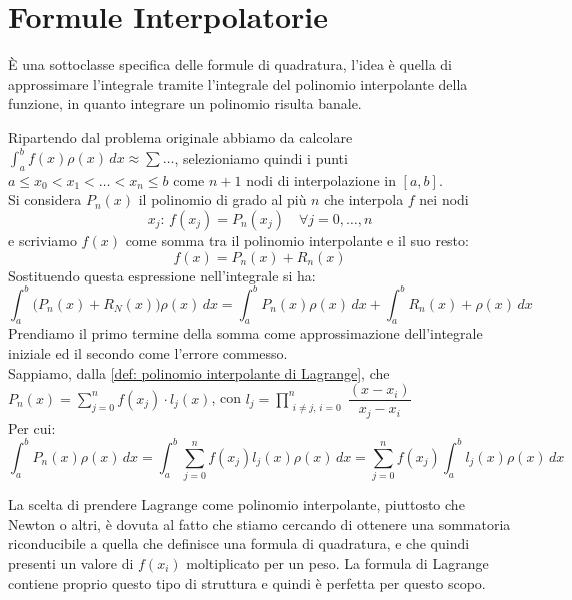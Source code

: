 \documentclass[12pt,a4paper,]{report}
\begin{document}
\section{Formule Interpolatorie}
\begin{nota}
    È una sottoclasse specifica delle formule di quadratura, l'idea è quella di approssimare l'integrale tramite l'integrale del polinomio interpolante della funzione, in quanto integrare un polinomio risulta banale. 
\end{nota}
\noindent
Ripartendo dal problema originale abbiamo da calcolare $\displaystyle\int_{a}^{b} f(x)\rho(x)\,dx \approx \sum \dots$, selezioniamo quindi i punti $a \leq x_0 < x_1 < \ldots < x_n \leq b$ come $n+1$ nodi di interpolazione in $[a, b]$.\\
Si considera $P_n(x)$ il polinomio di grado al più $n$ che interpola $f$ nei nodi 
\[
x_j:\, f(x_j) = P_n(x_j)\quad \forall j = 0,\ldots,n
\]
e scriviamo $f(x)$ come somma tra il polinomio interpolante e il suo resto:
$$f(x) = P_n(x) + R_n(x)$$
Sostituendo questa espressione nell'integrale si ha:
\[
\int_{a}^{b} \bigl(P_n(x) + R_N(x)\bigr)\rho(x)\,dx
= \int_{a}^{b} P_n(x)\rho(x)\,dx + \int_{a}^{b} R_n(x) + \rho(x)\,dx
\]
Prendiamo il primo termine della somma come approssimazione dell'integrale iniziale ed il secondo come l'errore commesso.
\\
Sappiamo, dalla \autoref{def: polinomio interpolante di Lagrange}, che $P_n(x) = \displaystyle\sum_{j=0}^{n} f(x_j) \cdot l_j(x)$, con $l_j = \displaystyle\prod_{\substack{i \neq j,\, i=0}}^{n} \dfrac{(x - x_i)}{x_j - x_i}$\\
Per cui:
\[
\int_{a}^{b} P_n(x)\rho(x)\,dx
= \int_{a}^{b} \sum_{j=0}^{n} f(x_j) l_j(x)\rho(x)\,dx
= \boxed{\sum_{j=0}^{n} f(x_j) \int_{a}^{b} l_j(x)\rho(x)\,dx}
\]
\begin{nota}
    La scelta di prendere Lagrange come polinomio interpolante, piuttosto che Newton o altri, è dovuta al fatto che stiamo cercando di ottenere una sommatoria riconducibile a quella che definisce una formula di quadratura, e che quindi presenti un valore di $f(x_i)$ moltiplicato per un peso.
    La formula di Lagrange contiene proprio questo tipo di struttura e quindi è perfetta per questo scopo. 
\end{nota}
\end{document}
